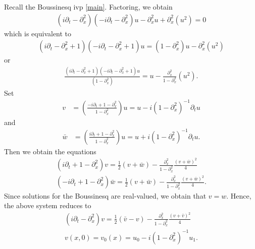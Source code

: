 \documentclass{amsart}
\newcommand{\p}{\partial}
\begin{document}
Recall the Boussinesq ivp \eqref{main}. Factoring, we obtain
%
%
\begin{equation*}
\begin{split}
  (i \p_{t} - \p_{x}^{2})(-i \p_{t} - \p_{x}^{2})u - \p_{x}^{2} u +
  \p_{x}^{2}(u^{2}) = 0
\end{split}
\end{equation*}
%
%
which is equivalent to
%
%
\begin{equation*}
\begin{split}
  (i \p_{t} - \p_{x}^{2} + 1)(-i \p_{t} - \p_{x}^{2} +1)u = (1 -
  \p_{x}^{2})u - \p_{x}^{2}(u^{2})
\end{split}
\end{equation*}
%
%
or
%
%
\begin{equation*}
\begin{split}
  \frac{(i \p_{t} - \p_{x}^{2} + 1)(-i \p_{t} - \p_{x}^{2} +1)u}{(1 -
  \p_{x}^{2})} = u - \frac{\p_{x}^{2}}{1 - \p_{x}^{2}}(u^{2}). 
\end{split}
\end{equation*}
%
%
Set
%
%
\begin{equation*}
\begin{split}
  v & = \left( \frac{-i \p_{t} + 1 -\p_{x}^{2}}{1 - \p_{x}^{2}} \right)u
  = u - i(1 - \p_{x}^{2})^{-1} \p_{t}u
\end{split}
\end{equation*}
and
\begin{equation*}
  \begin{split}
    \bar{w} & = \left( \frac{i \p_{t} + 1 -\p_{x}^{2}}{1 - \p_{x}^{2}} \right)u
  = u + i(1 - \p_{x}^{2})^{-1} \p_{t}u.
\end{split}
\end{equation*}
%
Then we obtain the equations
\begin{gather*}
  (i \p_{t} + 1 - \p_{x}^{2})v = \frac{1}{2}(v + \bar{w}) -
  \frac{\p_{x}^{2}}{1 - \p_{x}^{2}} \frac{(v + \bar{w})^{2}}{4}
  \\
  (-i \p_{t} + 1 - \p_{x}^{2})\bar{w}= \frac{1}{2}(v + \bar{w}) -
  \frac{\p_{x}^{2}}{1 - \p_{x}^{2}} \frac{(v + \bar{w})^{2}}{4}.
\end{gather*}
%
Since solutions for the Boussinesq are real-valued, we obtain that $v=w$. Hence,
the above system reduces to 
\begin{gather}
  \label{simp-sys}
  (i \p_{t} - \p_{x}^{2})v = \frac{1}{2}(\bar{v} -v) -
  \frac{\p_{x}^{2}}{1 - \p_{x}^{2}} \frac{(v + \bar{v})^{2}}{4}
  \\
  v(x,0) = v_{0}(x) = u_{0} - i(1 - \p_{x}^{2})^{-1}u_{1}.
  \label{simp-sys-init}
\end{gather}
%
%
%
%
%
%
%
%
%
%
\end{document}
